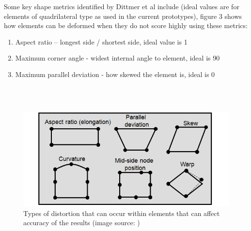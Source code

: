 \noindent
Some key shape metrics identified by Dittmer et al include (ideal values are for elements of quadrilateral type as used in  the current prototypes), figure 3 shows how elements can be deformed when they do not score highly using these metrics:

\begin{enumerate}[label=\Alph*]
\item Aspect ratio – longest side / shortest side, ideal value is 1
\item Maximum corner angle - widest internal angle to element, ideal is 90\degree
\item Maximum parallel deviation - how skewed the element is, ideal is 0\degree
\end{enumerate} \\ \\



\begin{figure}[H]
  \centerline{\includegraphics[width=120mm, scale=1]{../Graphics/varyingMeshQualityExamples.png}}
  \caption{Types of distortion that can occur within elements that can affect accuracy of the results (image source: \cite{ElementShapeQuality})}
\end{figure}
